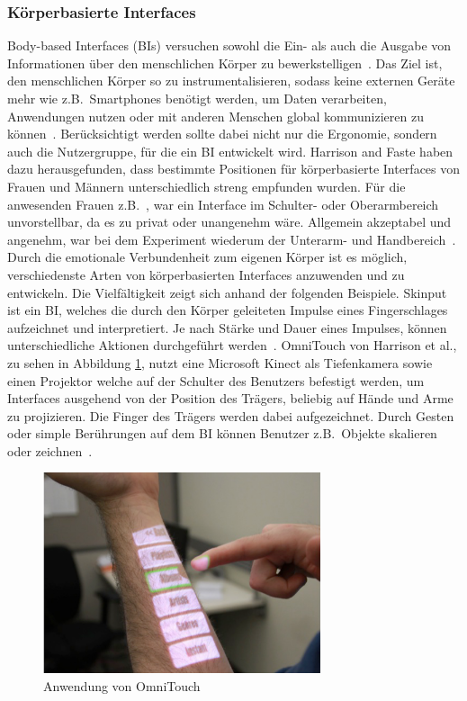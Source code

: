 \subsubsection{Körperbasierte Interfaces}
Body-based Interfaces (BIs) versuchen sowohl die Ein- als auch die Ausgabe von Informationen über den menschlichen Körper zu bewerkstelligen~\cite{implicationsoflocation}. Das Ziel ist, den menschlichen Körper so zu instrumentalisieren, sodass keine externen Geräte mehr wie z.B.~Smartphones benötigt werden, um Daten verarbeiten, Anwendungen nutzen oder mit anderen Menschen global kommunizieren zu können~\cite{skinput}. Berücksichtigt werden sollte dabei nicht nur die Ergonomie, sondern auch die Nutzergruppe, für die ein BI entwickelt wird. Harrison and Faste haben dazu herausgefunden, dass bestimmte Positionen für körperbasierte Interfaces von Frauen und Männern unterschiedlich streng empfunden wurden. Für die anwesenden Frauen z.B.~, war ein Interface im Schulter- oder Oberarmbereich unvorstellbar, da es zu privat oder unangenehm wäre. Allgemein akzeptabel und angenehm, war bei dem Experiment wiederum der Unterarm- und Handbereich~\cite{implicationsoflocation}. Durch die emotionale Verbundenheit zum eigenen Körper ist es möglich, verschiedenste Arten von körperbasierten Interfaces anzuwenden und zu entwickeln. Die Vielfältigkeit zeigt sich anhand der folgenden Beispiele. Skinput ist ein BI, welches die durch den Körper geleiteten Impulse eines Fingerschlages aufzeichnet und interpretiert. Je nach Stärke und Dauer eines Impulses, können unterschiedliche Aktionen durchgeführt werden~\cite{skinput}. OmniTouch von Harrison et al., zu sehen in Abbildung \ref{fig:omnitouch}, nutzt eine Microsoft Kinect als Tiefenkamera sowie einen Projektor welche auf der Schulter des Benutzers befestigt werden, um Interfaces ausgehend von der Position des Trägers, beliebig auf Hände und Arme zu projizieren. Die Finger des Trägers werden dabei aufgezeichnet. Durch Gesten oder simple Berührungen auf dem BI können Benutzer z.B.~Objekte skalieren oder zeichnen~\cite{omnitouch}.\\

\begin{figure}[h]
\captionsetup{width=.7\linewidth}
\includegraphics[scale=1]{Bilder/Hauptteil/onbodyinterface}
\centering
\caption{Anwendung von OmniTouch~\cite[p.~446]{omnitouch}}
\label{fig:omnitouch}
\end{figure}

